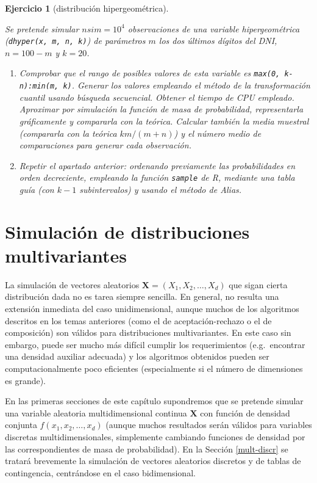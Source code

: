 \documentclass[
  10pt,
]{book}
\renewcommand{\mathbf}[1]{\symbf{#1}}
\theoremstyle{break}
\newtheorem{exercise}{Ejercicio}[chapter]
\theoremstyle{nonumberplain}
\begin{document}
\begin{exercise}[distribución hipergeométrica]
\protect\hypertarget{exr:hipergeom}{}\label{exr:hipergeom}

Se pretende simular \(nsim=10^{4}\) observaciones de una variable
hipergeométrica (\texttt{dhyper(x,\ m,\ n,\ k)}) de parámetros \(m\) los dos últimos dígitos del DNI, \(n=100-m\) y \(k=20\).

\begin{enumerate}
\def\labelenumi{\alph{enumi})}
\item
  Comprobar que el rango de posibles valores de esta variable es
  \texttt{max(0,\ k-n):min(m,\ k)}. Generar los valores empleando el método
  de la transformación cuantil usando búsqueda secuencial. Obtener
  el tiempo de CPU empleado. Aproximar por simulación la función
  de masa de probabilidad, representarla gráficamente y compararla
  con la teórica. Calcular también la media muestral (compararla
  con la teórica \(km/(m+n)\)) y el número medio de comparaciones
  para generar cada observación.
\item
  Repetir el apartado anterior: ordenando previamente las
  probabilidades en orden decreciente, empleando la
  función \texttt{sample} de R, mediante una tabla guía (con
  \(k-1\) subintervalos) y usando el método de Alias.
\end{enumerate}

\end{exercise}

\hypertarget{multivariante}{%
\chapter{Simulación de distribuciones multivariantes}\label{multivariante}}

La simulación de vectores aleatorios \(\mathbf{X} = \left( X_1, X_2, \ldots, X_d\right)\) que sigan cierta distribución dada no es tarea siempre sencilla.
En general, no resulta una extensión inmediata del caso unidimensional, aunque muchos de los algoritmos descritos en los temas anteriores (como el de aceptación-rechazo o el de composición) son válidos para distribuciones multivariantes.
En este caso sin embargo, puede ser mucho más difícil cumplir los requerimientos (e.g.~encontrar una densidad auxiliar adecuada) y los algoritmos obtenidos pueden ser computacionalmente poco eficientes (especialmente si el número de dimensiones es grande).

En las primeras secciones de este capítulo supondremos que se pretende simular una variable aleatoria multidimensional continua \(\mathbf{X}\) con función de densidad conjunta \(f\left( x_1, x_2, \ldots , x_d\right)\) (aunque muchos resultados serán válidos para variables discretas multidimensionales, simplemente cambiando funciones de densidad por las correspondientes de masa de probabilidad).
En la Sección \ref{mult-discr} se tratará brevemente la simulación de vectores aleatorios discretos y de tablas de contingencia, centrándose en el caso bidimensional.
\end{document}
